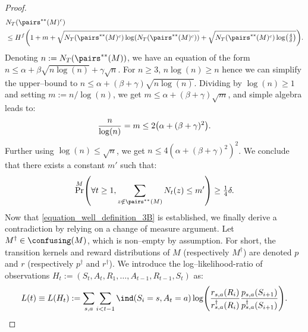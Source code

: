 \documentclass[preprint,cleveref,12pt]{colt2025}
\DeclarePairedDelimiter{\parens}{(}{)}	%
\newcommand{\indic}[1]{\ind\parens{#1}}
\def\indicator{\indic}
\begin{document}
\begin{proof}
\begin{align*}
            & N_T({\pairs^{**}(M)^c})
            \\
            & \le
            H^f \parens*{
                1 + m
                + \sqrt{
                    N_T({\pairs^{**}(M)^c})
                    \log\parens*{ N_T({\pairs^{**}(M)^c}) }
                }
                + \sqrt{
                    N_T({\pairs^{**}(M)^c})
                    \log\parens*{\tfrac 4\delta}
                }
            }
            .
        \end{align*}
        Denoting $n := N_T({\pairs^{**}(M)})$, we have an equation of the form $n \le \alpha + \beta \sqrt{n \log(n)} + \gamma \sqrt{n}$. 
        For $n \ge 3$, $n \log(n) \ge n$ hence we can simplify the upper--bound to $n \le \alpha + (\beta + \gamma) \sqrt{n \log(n)}$.
        Dividing by $\log(n) \ge 1$ and setting $m := n/\log(n)$, we get $m \le \alpha + (\beta + \gamma) \sqrt{m}$, and simple algebra leads to:
        \begin{equation*}
            \frac{n}{\log(n)} = m \le 2\parens*{\alpha + (\beta + \gamma)^2}.
        \end{equation*}
        Further using $\log(n) \le \sqrt{n}$, we get $n \le 4(\alpha + (\beta+\gamma)^2)^2$.
        We conclude that there exists a constant $m'$ such that:
        \begin{equation}
        \label{equation_well_definition_3B}
            \Pr^{M} \parens*{
                \forall t \ge 1,
                \sum_{z \notin \pairs^{**}(M)}
                N_t(z)
                \le m'
            } \ge \tfrac 14 \delta.
        \end{equation}
        Now that \eqref{equation_well_definition_3B} is established, we finally derive a contradiction by relying on a change of measure argument.
        Let $M^\dagger \in \confusing(M)$, which is non--empty by assumption.
        For short, the transition kernels and reward distributions of $M$ (respectively $M^\dagger$) are denoted $p$ and $r$ (respectively $p^\dagger$ and $r^\dagger$).
        We introduce the log--likelihood-ratio of observations $H_t := (S_t, A_t, R_1, \ldots, A_{t-1}, R_{t-1}, S_t)$ as:
        \begin{equation*}
            L(t)
            \equiv L(H_t)
            :=
            \sum_{s,a} \sum_{i < t-1} 
            \indicator{S_i = s, A_t = a}
            \log\parens*{
                \frac{r_{s,a}(R_i)}{r_{s,a}^\dagger(R_i)}
                \frac{p_{s,a}(S_{i+1})}{p^\dagger_{s,a}(S_{i+1})}
            }
            .
        \end{equation*}

\end{proof}
\end{document}
